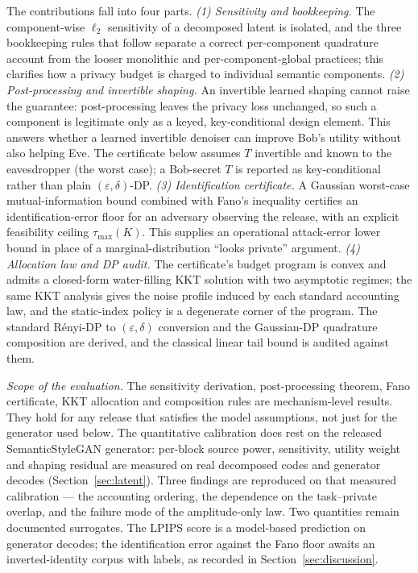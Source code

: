 \documentclass{ieeetj}
\theoremstyle{plain}
\theoremstyle{definition}
\begin{document}
The contributions fall into four parts.
\emph{(1) Sensitivity and bookkeeping.} The component-wise $\ell_2$ sensitivity
of a decomposed latent is isolated, and the three bookkeeping rules that follow
separate a correct per-component quadrature account from the looser monolithic
and per-component-global practices; this clarifies how a privacy budget is
charged to individual semantic components.
\emph{(2) Post-processing and invertible shaping.} An invertible learned shaping
cannot raise the guarantee: post-processing leaves the privacy loss unchanged,
so such a component is legitimate only as a keyed, key-conditional design
element. This answers whether a learned invertible denoiser can improve Bob's
utility without also helping Eve. The certificate below assumes $T$ invertible
and known to the eavesdropper (the worst case); a Bob-secret $T$ is reported as
key-conditional rather than plain $(\varepsilon,\delta)$-DP.
\emph{(3) Identification certificate.} A Gaussian worst-case mutual-information
bound combined with Fano's inequality certifies an identification-error floor
for an adversary observing the release, with an explicit feasibility ceiling
$\tau_{\max}(K)$. This supplies an operational attack-error lower bound in
place of a marginal-distribution ``looks private'' argument.
\emph{(4) Allocation law and DP audit.} The certificate's budget program is
convex and admits a closed-form water-filling KKT solution with two asymptotic
regimes; the same KKT analysis gives the noise profile induced by each standard
accounting law, and the static-index policy is a degenerate corner of the
program. The standard R\'enyi-DP to $(\varepsilon,\delta)$ conversion and the
Gaussian-DP quadrature composition are derived, and the classical linear tail
bound is audited against them.

\emph{Scope of the evaluation.} The sensitivity derivation, post-processing theorem, Fano certificate, KKT
allocation and composition rules are mechanism-level results. They hold for any release
that satisfies the model assumptions, not just for the generator used below. The
quantitative calibration does rest on the released SemanticStyleGAN generator: per-block
source power, sensitivity, utility weight and shaping residual are measured on real
decomposed codes and generator decodes (Section~\ref{sec:latent}). Three findings are reproduced on
that measured calibration --- the accounting ordering, the dependence on the
task--private overlap, and the failure mode of the amplitude-only law. Two quantities
remain documented surrogates. The LPIPS score is a model-based prediction on generator
decodes; the identification error against the Fano floor awaits an inverted-identity
corpus with labels, as recorded in Section~\ref{sec:discussion}.
\end{document}
